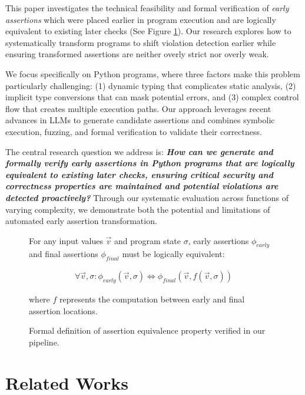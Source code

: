 \documentclass[8pt]{extarticle}
\begin{document}
This paper investigates the technical feasibility and formal verification of \textit{early assertions} which were placed earlier in program execution and are logically equivalent to existing later checks (See Figure \ref{eq:assertion-equivalence}). Our research explores how to systematically transform programs to shift violation detection earlier while ensuring transformed assertions are neither overly strict nor overly weak.

We focus specifically on Python programs, where three factors make this problem particularly challenging: (1) dynamic typing that complicates static analysis, (2) implicit type conversions that can mask potential errors, and (3) complex control flow that creates multiple execution paths. Our approach leverages recent advances in LLMs to generate candidate assertions and combines symbolic execution, fuzzing, and formal verification to validate their correctness.

The central research question we address is: \textit{\textbf{How can we generate and formally verify early assertions in Python programs that are logically equivalent to existing later checks, ensuring critical security and correctness properties are maintained and potential violations are detected proactively?}} Through our systematic evaluation across functions of varying complexity, we demonstrate both the potential and limitations of automated early assertion transformation.

\begin{figure}[H]
\centering
\begin{tcolorbox}[colback=white,colframe=black,sharp corners,boxrule=1pt,title=\textbf{Logical Equivalence of Assertions}]
For any input values $\vec{v}$ and program state $\sigma$, early assertions $\phi_{early}$ and final assertions $\phi_{final}$ must be logically equivalent:

\begin{align}
\forall \vec{v}, \sigma: \phi_{early}(\vec{v}, \sigma) \Leftrightarrow \phi_{final}(\vec{v}, f(\vec{v}, \sigma))
\end{align}

where $f$ represents the computation between early and final assertion locations.
\end{tcolorbox}
\caption{Formal definition of assertion equivalence property verified in our pipeline.}
\label{eq:assertion-equivalence}
\end{figure}

\section{Related Works}
\end{document}
